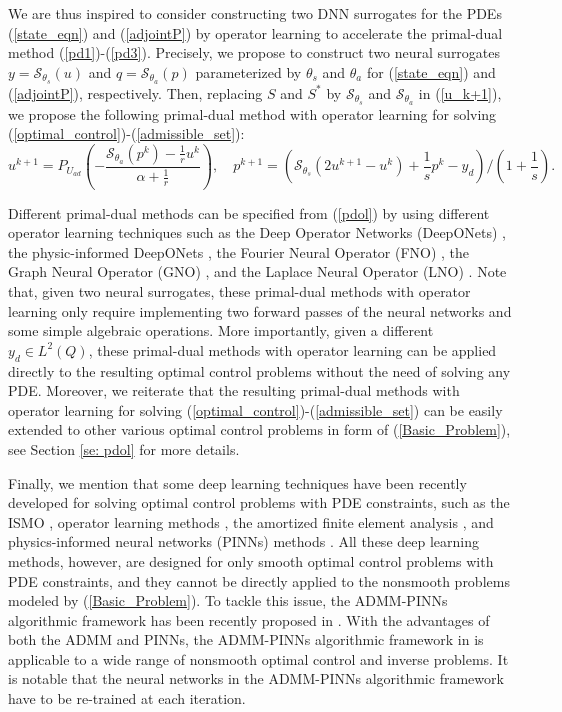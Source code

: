 \documentclass[final]{siamart171218}
\theoremstyle{remark}
\begin{document}
We are thus inspired to consider constructing two DNN surrogates for the PDEs (\ref{state_eqn}) and (\ref{adjointP}) by operator learning to accelerate the primal-dual method (\ref{pd1})-(\ref{pd3}). Precisely, we propose to construct two neural surrogates $y=\mathcal{S}_{\theta_s}(u)$ and $q=\mathcal{S}_{\theta_a}(p)$ parameterized by $\theta_s$ and $\theta_a$ for (\ref{state_eqn}) and (\ref{adjointP}), respectively. Then, replacing $S$ and $S^*$ by $\mathcal{S}_{\theta_s}$ and $\mathcal{S}_{\theta_a}$ in (\ref{u_k+1}), we propose the following primal-dual method with operator learning for solving (\ref{optimal_control})-(\ref{admissible_set}):
\begin{equation}\label{pdol}
u^{k+1}=P_{U_{ad}}\left(-\frac{\mathcal{S}_{\theta_a}({p}^k)-\frac{1}{r}u^k}{\alpha+\frac{1}{r}}\right), \quad p^{k+1}=\left(\mathcal{S}_{\theta_s}(2u^{k+1}-u^k)+\frac{1}{s}p^k-y_d\right)/(1+\frac{1}{s}).
\end{equation}

Different primal-dual methods can be specified from (\ref{pdol}) by using different operator learning techniques such as the Deep Operator Networks (DeepONets) \cite{lu2021learning}, the physic-informed DeepONets \cite{wang2021}, the Fourier Neural Operator (FNO) \cite{li2020FNO}, the Graph Neural Operator (GNO) \cite{li2020GNO}, and the Laplace Neural Operator (LNO) \cite{cao2023}. Note that, given two neural surrogates, these primal-dual methods with operator learning only require implementing two forward passes of the neural networks and some simple algebraic operations. More importantly, given a different $y_d\in L^2(Q)$, these primal-dual methods with operator learning can be applied directly to the resulting optimal control problems without the need of solving any PDE. Moreover, we reiterate that the resulting primal-dual methods with operator learning for solving (\ref{optimal_control})-(\ref{admissible_set}) can be easily extended to other various optimal control problems in form of (\ref{Basic_Problem}), see Section \ref{se: pdol} for more details.

Finally, we mention that some deep learning techniques have been recently developed for solving optimal control problems with PDE constraints, such as the ISMO \cite{lye2021iterative}, operator learning methods \cite{hwang2021solving,wang2021fast}, the amortized finite element analysis \cite{xue2020}, and physics-informed neural networks (PINNs) methods \cite{barry2022,haoBilevel2022,mowlayi2021,raissi2019physics,sun2022}. All these deep learning methods, however, are designed for only smooth optimal control problems with PDE constraints, and they cannot be directly applied to the nonsmooth problems modeled by (\ref{Basic_Problem}). To tackle this issue, the ADMM-PINNs algorithmic framework has been recently proposed in \cite{song2023admmpinns}. With the advantages of both the ADMM and PINNs, the ADMM-PINNs algorithmic framework in \cite{song2023admmpinns} is applicable to a wide range of nonsmooth optimal control and inverse problems. It is notable that the neural networks in the ADMM-PINNs algorithmic framework have to be re-trained at each iteration.
\end{document}
